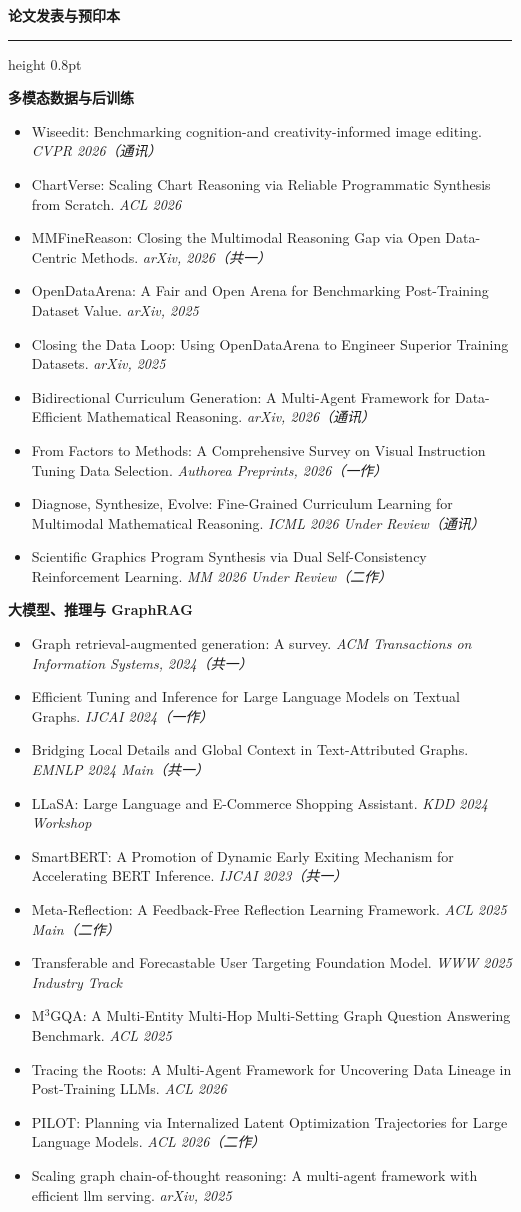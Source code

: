 \documentclass[UTF8]{ctexart}
\newcommand{\cvsection}[1]{%
  \vspace{0.35em}
  {\zihao{-3}\bfseries #1\par}
  \vspace{0.1em}
  {\color{cvrule}\hrule height 0.8pt}
  \vspace{0.36em}
}
\newcommand{\pubitem}[2]{\item #1 \textit{#2}}
\newcommand{\pubgroup}[1]{\vspace{0.18em}\textbf{#1}\par}
\begin{document}
\cvsection{论文发表与预印本}
{\small
\pubgroup{多模态数据与后训练}
\begin{itemize}[leftmargin=1.2em,itemsep=0.12em,topsep=1.5pt]
  \pubitem{Wiseedit: Benchmarking cognition-and creativity-informed image editing.}{CVPR 2026（通讯）}
  \pubitem{ChartVerse: Scaling Chart Reasoning via Reliable Programmatic Synthesis from Scratch.}{ACL 2026}
  \pubitem{MMFineReason: Closing the Multimodal Reasoning Gap via Open Data-Centric Methods.}{arXiv, 2026（共一）}
  \pubitem{OpenDataArena: A Fair and Open Arena for Benchmarking Post-Training Dataset Value.}{arXiv, 2025}
  \pubitem{Closing the Data Loop: Using OpenDataArena to Engineer Superior Training Datasets.}{arXiv, 2025}
  \pubitem{Bidirectional Curriculum Generation: A Multi-Agent Framework for Data-Efficient Mathematical Reasoning.}{arXiv, 2026（通讯）}
  \pubitem{From Factors to Methods: A Comprehensive Survey on Visual Instruction Tuning Data Selection.}{Authorea Preprints, 2026（一作）}
  \pubitem{Diagnose, Synthesize, Evolve: Fine-Grained Curriculum Learning for Multimodal Mathematical Reasoning.}{ICML 2026 Under Review（通讯）}
  \pubitem{Scientific Graphics Program Synthesis via Dual Self-Consistency Reinforcement Learning.}{MM 2026 Under Review（二作）}
\end{itemize}
\pubgroup{大模型、推理与 GraphRAG}
\begin{itemize}[leftmargin=1.2em,itemsep=0.12em,topsep=1.5pt]
  \pubitem{Graph retrieval-augmented generation: A survey.}{ACM Transactions on Information Systems, 2024（共一）}
  \pubitem{Efficient Tuning and Inference for Large Language Models on Textual Graphs.}{IJCAI 2024（一作）}
  \pubitem{Bridging Local Details and Global Context in Text-Attributed Graphs.}{EMNLP 2024 Main（共一）}
  \pubitem{LLaSA: Large Language and E-Commerce Shopping Assistant.}{KDD 2024 Workshop}
  \pubitem{SmartBERT: A Promotion of Dynamic Early Exiting Mechanism for Accelerating BERT Inference.}{IJCAI 2023（共一）}
  \pubitem{Meta-Reflection: A Feedback-Free Reflection Learning Framework.}{ACL 2025 Main（二作）}
  \pubitem{Transferable and Forecastable User Targeting Foundation Model.}{WWW 2025 Industry Track}
  \pubitem{M$^3$GQA: A Multi-Entity Multi-Hop Multi-Setting Graph Question Answering Benchmark.}{ACL 2025}
  \pubitem{Tracing the Roots: A Multi-Agent Framework for Uncovering Data Lineage in Post-Training LLMs.}{ACL 2026}
  \pubitem{PILOT: Planning via Internalized Latent Optimization Trajectories for Large Language Models.}{ACL 2026（二作）}
  \pubitem{Scaling graph chain-of-thought reasoning: A multi-agent framework with efficient llm serving.}{arXiv, 2025}

\end{itemize}}
\end{document}
